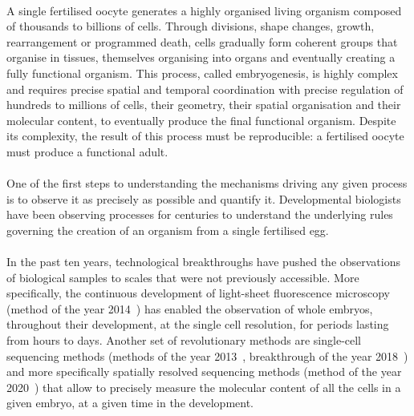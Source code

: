 \paragraph{}A single fertilised oocyte generates a highly organised living organism composed of thousands to billions of cells.
Through divisions, shape changes, growth, rearrangement or programmed death, cells gradually form coherent groups that organise in tissues, themselves organising into organs and eventually creating a fully functional organism.
This process, called embryogenesis, is highly complex and requires precise spatial and temporal coordination with precise regulation of hundreds to millions of cells, their geometry, their spatial organisation and their molecular content, to eventually produce the final functional organism.
Despite its complexity, the result of this process must be reproducible: a fertilised oocyte must produce a functional adult.
\paragraph{}One of the first steps to understanding the mechanisms driving any given process is to observe it as precisely as possible and quantify it.
Developmental biologists have been observing processes for centuries to understand the underlying rules governing the creation of an organism from a single fertilised egg.
\paragraph{}In the past ten years, technological breakthroughs have pushed the observations of biological samples to scales that were not previously accessible.
More specifically, the continuous development of light-sheet fluorescence microscopy (method of the year 2014~\cite{Meth:2015aa}) has enabled the observation of whole embryos, throughout their development, at the single cell resolution, for periods lasting from hours to days.
Another set of revolutionary methods are single-cell sequencing methods (methods of the year 2013~\cite{Meth:2014aa}, breakthrough of the year 2018~\cite{Crespi2018}) and more specifically spatially resolved sequencing methods (method of the year 2020~\cite{Meth2021}) that allow to precisely measure the molecular content of all the cells in a given embryo, at a given time in the development.
